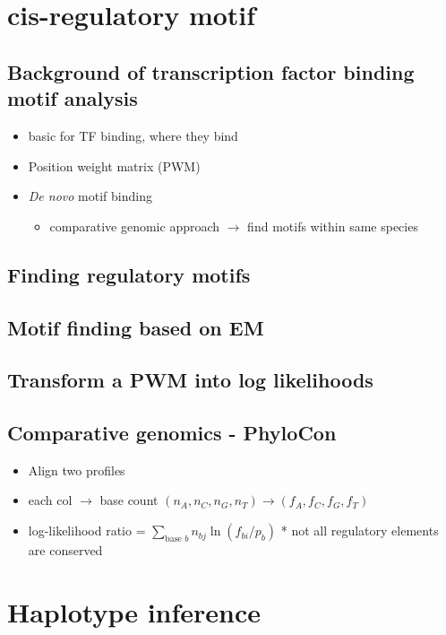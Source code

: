 \documentclass[font=12pt]{article}
\begin{document}
\newpage
\section{cis-regulatory motif}
\subsection{Background of transcription factor binding motif analysis}
\begin{itemize}
	\item basic for TF binding, where they bind
	\item Position weight matrix (PWM)
	\item \textit{De novo} motif binding
	\begin{itemize}
		\item comparative genomic approach $\to$ find motifs within same species
	\end{itemize}
\end{itemize}

\subsection{Finding regulatory motifs}

\subsection{Motif finding based on EM}

\subsection{Transform a PWM into log likelihoods}

\subsection{Comparative genomics - PhyloCon}
\begin{itemize}
	\item Align two profiles
	\item each col $\to$ base count $ (n_A, n_C, n_G, n_T) \to (f_A, f_C,f_G,f_T)$
	\item log-likelihood ratio = $ \sum_{\text{base }b} n_{bj}\ln (f_{bi}/p_b)  $
	* not all regulatory elements are conserved\\
\end{itemize}

\newpage
\section{Haplotype inference}
\end{document}
